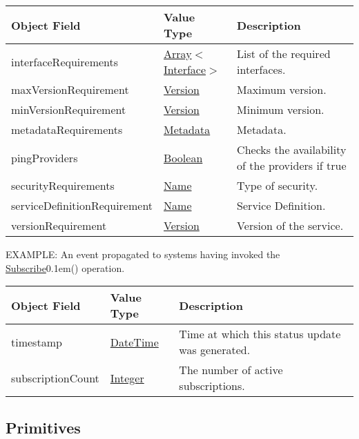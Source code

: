 \documentclass[a4paper]{arrowhead}
\newcommand{\oref}[1]{{\textcolor{ArrowheadBlue}{\hyperref[sec:operations:#1]{#1}}{\kern 0.1em}()}}
\newcommand{\pref}[1]{{\textcolor{ArrowheadGrey}{\hyperref[sec:model:primitives:#1]{#1}}}}
\begin{document}
\begin{table}[ht!]
\begin{tabularx}{\textwidth}{| p{5cm} | p{3.5cm} | X |} \hline
\rowcolor{gray!33} Object Field & Value Type      & Description \\ \hline
interfaceRequirements           & \pref{Array}$<$\pref{Interface}$>$ & List of the required interfaces. \\ \hline
maxVersionRequirement           & \pref{Version}  & Maximum version. \\ \hline
minVersionRequirement           & \pref{Version}  & Minimum version. \\ \hline
metadataRequirements            & \pref{Metadata} & Metadata. \\ \hline
pingProviders                   & \pref{Boolean}  & Checks the availability of the providers if true \\ \hline
securityRequirements            & \pref{Name}     & Type of security. \\ \hline
serviceDefinitionRequirement    & \pref{Name}     & Service Definition. \\ \hline
versionRequirement              & \pref{Version}  & Version of the service. \\ \hline
\end{tabularx}
\end{table}


\color{red}
EXAMPLE: An event propagated to systems having invoked the \oref{Subscribe}
operation.
\color{black}

\begin{table}[ht!]
\begin{tabularx}{\textwidth}{| p{5cm} | p{3.5cm} | X |} \hline
\rowcolor{gray!33} Object Field & Value Type      & Description \\ \hline
timestamp                       & \pref{DateTime} & Time at which this status update was generated. \\ \hline
subscriptionCount              & \pref{Integer}  & The number of active subscriptions. \\ \hline
\end{tabularx}
\end{table}

\newpage

\subsection{Primitives}
\label{sec:model:primitives}
\end{document}
